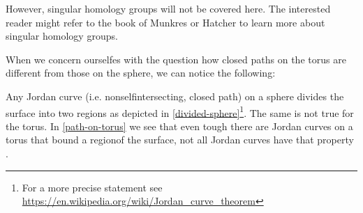 \documentclass[draft,toc=bib]{scrartcl}
\theoremstyle{plain}
\theoremstyle{definition}
\theoremstyle{remark}
\begin{document}
However, singular homology groups will not be covered here. The interested reader might refer to the book of Munkres \cite{mu} or Hatcher \cite{ha} to learn more about singular homology groups.

When we concern ourselfes with the question how closed paths on the torus are different from those on the sphere, we can notice the following:

Any Jordan curve (i.e. nonselfintersecting, closed path) on a sphere divides the surface into two \glqq regions\grqq{} as depicted in \autoref{divided-sphere}\footnote{For a more precise statement see \url{https://en.wikipedia.org/wiki/Jordan_curve_theorem}}. The same is not true for the torus. In \autoref{path-on-torus} we see that even tough there are Jordan curves on a torus that bound a \glqq region\grqq of the surface, not all Jordan curves have that property \cite[p. 173f][see]{ar}.


\end{document}
